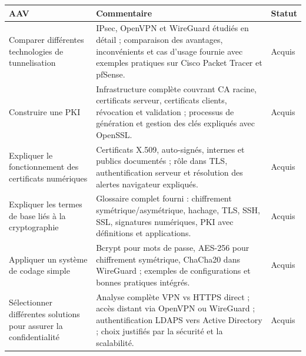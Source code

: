 \begin{center}
\setlength{\tabcolsep}{10pt}
\begin{tabular}{|p{}|p{}|m{}|}
\hline
\textbf{AAV} & \textbf{Commentaire} & \textbf{Statut} \\ \hline

Comparer différentes technologies de tunnelisation &
IPsec, OpenVPN et WireGuard étudiés en détail ; comparaison des avantages, inconvénients et cas d'usage fournie avec exemples pratiques sur Cisco Packet Tracer et pfSense. &
{\color{green!60!black}Acquis} \\ \hline

Construire une PKI &
Infrastructure complète couvrant CA racine, certificats serveur, certificats clients, révocation et validation ; processus de génération et gestion des clés expliqués avec OpenSSL. &
{\color{green!60!black}Acquis} \\ \hline

Expliquer le fonctionnement des certificats numériques &
Certificats X.509, auto-signés, internes et publics documentés ; rôle dans TLS, authentification serveur et résolution des alertes navigateur expliqués. &
{\color{green!60!black}Acquis} \\ \hline

Expliquer les termes de base liés à la cryptographie &
Glossaire complet fourni : chiffrement symétrique/asymétrique, hachage, TLS, SSH, SSL, signatures numériques, PKI avec définitions et applications. &
{\color{green!60!black}Acquis} \\ \hline

Appliquer un système de codage simple &
Bcrypt pour mots de passe, AES-256 pour chiffrement symétrique, ChaCha20 dans WireGuard ; exemples de configurations et bonnes pratiques intégrés. &
{\color{green!60!black}Acquis} \\ \hline

Sélectionner différentes solutions pour assurer la confidentialité &
Analyse complète VPN vs HTTPS direct ; accès distant via OpenVPN ou WireGuard ; authentification LDAPS vers Active Directory ; choix justifiés par la sécurité et la scalabilité. &
{\color{green!60!black}Acquis} \\ \hline

\end{tabular}
\end{center}

\newpage

